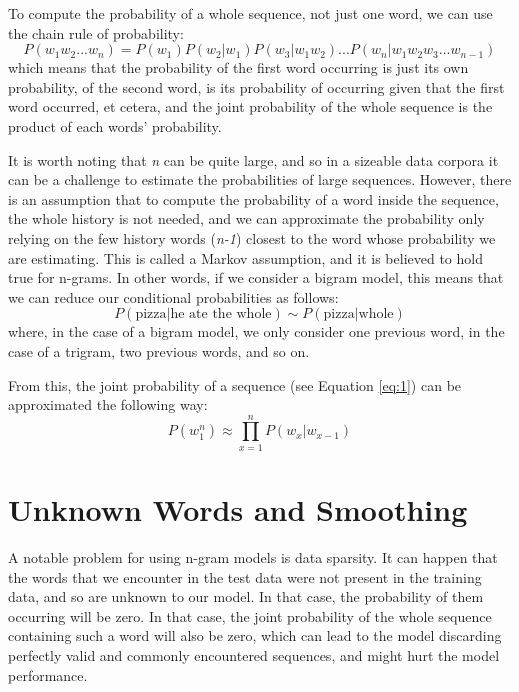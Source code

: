 To compute the probability of a whole sequence, not just one word, we can use the chain rule of probability:
\begin{equation}
    P(w_1w_2...w_n) = P(w_1)P(w_2|w_1)P(w_3|w_1w_2)...P(w_n|w_1w_2w_3...w_{n-1})\label{eq:1}
\end{equation}
which means that the probability of the first word occurring is just its own probability, of the second word, is its probability of occurring given that the first word occurred, et cetera, and the joint probability of the whole sequence is the product of each words' probability.

It is worth noting that \textit{n} can be quite large, and so in a sizeable data corpora it can be a challenge to estimate the probabilities of large sequences. However, there is an assumption that to compute the probability of a word inside the sequence, the whole history is not needed, and we can approximate the probability only relying on the few history words (\textit{n-1}) closest to the word whose probability we are estimating. This is called a Markov assumption, and it is believed to hold true for n-grams. In other words, if we consider a bigram model, this means that we can reduce our conditional probabilities as follows:
\begin{equation}
    P(\text{pizza}|\text{he ate the whole}) \sim P(\text{pizza}|\text{whole})
\end{equation}
where, in the case of a bigram model, we only consider one previous word, in the case of a trigram, two previous words, and so on.

From this, the joint probability of a sequence (see Equation \ref{eq:1}) can be approximated the following way:
\begin{equation}
    P(w_1^n) \approx \prod_{x=1}^n P(w_x|w_{x-1})
\end{equation}

\section{Unknown Words and Smoothing}
\label{sec:NgramBackground-Smoothing}
A notable problem for using n-gram models is data sparsity. It can happen that the words that we encounter in the test data were not present in the training data, and so are unknown to our model. In that case, the probability of them occurring will be zero. In that case, the joint probability of the whole sequence containing such a word will also be zero, which can lead to the model discarding perfectly valid and commonly encountered sequences, and might hurt the model performance.

